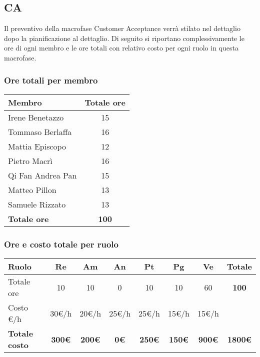 \subsection{CA}
Il preventivo della macrofase Customer Acceptance verrà stilato nel dettaglio dopo la pianificazione al dettaglio. \newline
Di seguito si riportano complessivamente le ore di ogni membro e le ore totali con relativo costo per ogni ruolo in questa macrofase.
\subsubsection*{Ore totali per membro}
\begin{center}
	\renewcommand{\arraystretch}{1.8} %
	\begin{tabular}{ |m{10em}|c| }
	\hline
	\textbf{Membro} & \textbf{Totale ore}\\
    \hline
    Irene Benetazzo   & 15 \\
    \hline
    Tommaso Berlaffa  & 16 \\
    \hline
    Mattia Episcopo   & 12 \\
    \hline
    Pietro Macrì      & 16 \\
    \hline
    Qi Fan Andrea Pan & 15 \\
    \hline
    Matteo Pillon     & 13 \\
    \hline
    Samuele Rizzato   & 13 \\
    \hline
    \textbf{Totale ore} & \textbf{100} \\
    \hline
	\end{tabular}
\end{center}

\subsubsection*{Ore e costo totale per ruolo}
\begin{center}
	\renewcommand{\arraystretch}{1.8} %
	\begin{tabular}{ |m{10em}|c|c|c|c|c|c|c| }
	\hline
	\textbf{Ruolo} & \textbf{Re} & \textbf{Am} &  \textbf{An} &  \textbf{Pt} &  \textbf{Pg} &  \textbf{Ve} &  \textbf{Totale}\\
    \hline
    Totale ore & 10 & 10 & 0 & 10 & 10 & 60 & \textbf{100}\\
    \hline
    Costo \euro/h & 30\euro/h & 20\euro/h & 25\euro/h & 25\euro/h & 15\euro/h & 15\euro/h & \\
    \hline
    \textbf{Totale costo} & \textbf{300\euro} & \textbf{200\euro} &  \textbf{0\euro} &  \textbf{250\euro} &  \textbf{150\euro} &  \textbf{900\euro} &  \textbf{1800\euro}\\
    \hline
	\end{tabular}
\end{center}

\newpage